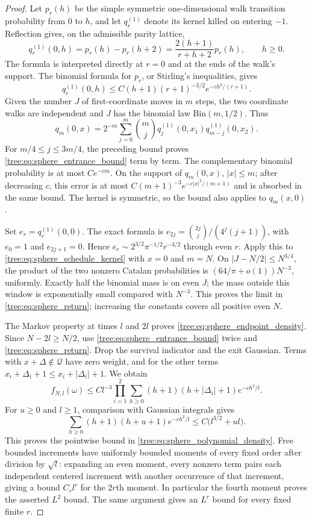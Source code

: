 \begin{proof}
Let $p_r(h)$ be the simple symmetric one-dimensional walk transition
probability from $0$ to $h$, and let $q_r^{(1)}$ denote its kernel killed
on entering $-1$.  Reflection gives, on the admissible parity lattice,
\begin{equation}\label{tree:eq:sphere_reflection_1d}
 q_r^{(1)}(0,h)=p_r(h)-p_r(h+2)
       =\frac{2(h+1)}{r+h+2}p_r(h),\qquad h\geq0.
\end{equation}
The formula is interpreted directly at $r=0$ and at the ends of the walk's
support.  The binomial formula for $p_r$, or Stirling's inequalities, gives
\[
 q_r^{(1)}(0,h)\leq C(h+1)(r+1)^{-3/2}
                    e^{-ch^2/(r+1)}.
\]
Given the number $J$ of first-coordinate moves in $m$ steps, the two
coordinate walks are independent and $J$ has the binomial law
$\mathrm{Bin}(m,1/2)$.  Thus
\begin{equation}\label{tree:eq:sphere_schedule_kernel}
 q_m(0,x)=2^{-m}\sum_{j=0}^m\binom mj
                  q_j^{(1)}(0,x_1)q_{m-j}^{(1)}(0,x_2).
\end{equation}
For $m/4\leq j\leq3m/4$, the preceding bound proves
\eqref{tree:eq:sphere_entrance_bound} term by term.  The complementary binomial
probability is at most $Ce^{-cm}$.  On the support of $q_m(0,x)$,
$|x|\leq m$; after decreasing $c$, this error is at most
$C(m+1)^{-3}e^{-c|x|^2/(m+1)}$ and is absorbed in the same bound.
The kernel is symmetric, so the bound also applies to $q_m(x,0)$.

Set $e_r=q_r^{(1)}(0,0)$.  The exact formula is
$e_{2j}=\binom{2j}{j}/(4^j(j+1))$, with $e_0=1$ and $e_{2j+1}=0$.
Hence $e_r\sim 2^{3/2}\pi^{-1/2}r^{-3/2}$ through even $r$.
Apply this to \eqref{tree:eq:sphere_schedule_kernel} with $x=0$ and $m=N$.
On $|J-N/2|\leq N^{3/4}$, the product of the two nonzero Catalan
probabilities is $(64/\pi+o(1))N^{-3}$, uniformly.  Exactly half the
binomial mass is on even $J$; the mass outside this window is exponentially
small compared with $N^{-3}$.  This proves the limit in
\eqref{tree:eq:sphere_return}; increasing the constants covers all positive
even $N$.

The Markov property at times $l$ and $2l$ proves
\eqref{tree:eq:sphere_endpoint_density}.  Since $N-2l\geq N/2$, use
\eqref{tree:eq:sphere_entrance_bound} twice and
\eqref{tree:eq:sphere_return}.  Drop the survival indicator and the exit
Gaussian.  Terms with $x+\Delta\notin\mathcal Q$ have zero weight, and
for the other terms $x_i+\Delta_i+1\leq x_i+|\Delta_i|+1$.  We obtain
\[
 f_{N,l}(\omega)\leq C l^{-3}\prod_{i=1}^2
  \sum_{h\geq0}(h+1)(h+|\Delta_i|+1)e^{-ch^2/l}.
\]
For $u\geq0$ and $l\geq1$, comparison with Gaussian integrals gives
\[
 \sum_{h\geq0}(h+1)(h+u+1)e^{-ch^2/l}
       \leq C\big(l^{3/2}+ul\big).
\]
This proves the pointwise bound in \eqref{tree:eq:sphere_polynomial_density}.
Free bounded increments have uniformly bounded moments of every fixed
order after division by $\sqrt l$: expanding an even moment, every
nonzero term pairs each independent centered increment with another
occurrence of that increment, giving a bound $C_r l^r$ for the $2r$th
moment.  In particular the fourth moment proves the asserted $L^2$ bound.
The same argument gives an $L^r$ bound for every fixed finite $r$.


\end{proof}
